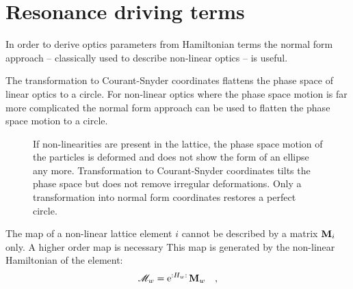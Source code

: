 \section{Resonance driving terms}

In order to derive optics parameters from Hamiltonian terms the normal form approach
\cite{Bartolini1997,Tomas2005} -- classically
used to describe non-linear optics -- is useful. 

The transformation to Courant-Snyder coordinates flattens the phase space of linear optics to a circle.
For non-linear optics where the phase space motion is far more complicated the normal form approach
can be used to flatten the phase space motion to a circle.

\begin{figure}[h]
    \centering
    
    
    
    \caption{
      If non-linearities are present in the lattice, the phase space motion of the particles is
      deformed and does not show the form of an ellipse any more. 
      Transformation to Courant-Snyder
      coordinates tilts the phase space but does not remove irregular deformations.
      Only a transformation into normal form coordinates restores a perfect circle.
    }
    \label{fig_phase_space_ellipse_nl}
\end{figure}

The map of a non-linear lattice element $i$ cannot be described by a matrix $\mathbf{M}_i$ only.
A higher order map is necessary
This map is generated by the non-linear Hamiltonian of the element:
%
\begin{equation}
    \mathscr{M}_w = \text{e}^{{:}H_w{:}\,} \mathbf{M}_w
    \quad ,
\end{equation}
%
 
